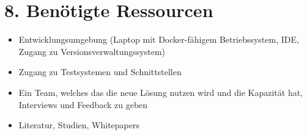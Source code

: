 \section*{8. Benötigte Ressourcen}
\begin{itemize}
    \item Entwicklungsumgebung (Laptop mit Docker-fähigem Betriebssystem, IDE, Zugang zu Versionsverwaltungssystem)
    \item Zugang zu Testsystemen und Schnittstellen
    \item Ein Team, welches das die neue Lösung nutzen wird und die Kapazität hat, Interviews und Feedback zu geben
    \item Literatur, Studien, Whitepapers

\end{itemize}